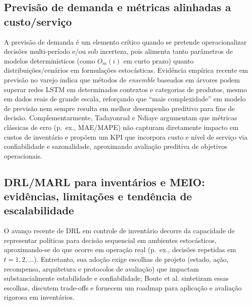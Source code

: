 \subsection{Previsão de demanda e métricas alinhadas a custo/serviço}

A previsão de demanda é um elemento crítico quando se pretende operacionalizar decisões multi-período e/ou sob incerteza, pois alimenta tanto parâmetros de modelos determinísticos (como \(O_m(i)\) em curto prazo) quanto distribuições/cenários em formulações estocásticas. Evidência empírica recente em previsão no varejo indica que métodos de \emph{ensemble} baseados em árvores podem superar redes LSTM em determinados contextos e categorias de produtos, mesmo em dados reais de grande escala, reforçando que ``mais complexidade'' em modelo de previsão nem sempre resulta em melhor desempenho preditivo para fins de decisão. \cite{Nasseri2023RetailDemandPrediction} Complementarmente, Tadayonrad e Ndiaye argumentam que métricas clássicas de erro (p.\ ex., MAE/MAPE) não capturam diretamente impacto em custos de inventário e propõem um KPI que incorpora custo e nível de serviço via confiabilidade e sazonalidade, aproximando avaliação preditiva de objetivos operacionais. \cite{TadayonradNdiaye2023KPIDemandForecasting}


\subsection{DRL/MARL para inventários e MEIO: evidências, limitações e tendência de escalabilidade}

O avanço recente de DRL em controle de inventário decorre da capacidade de representar políticas para decisão sequencial em ambientes estocásticos, aproximando-se do que ocorre em operação real (p.\ ex., decisões repetidas em \(t=1,2,\dots\)). Entretanto, sua adoção exige escolhas de projeto (estado, ação, recompensa, arquitetura e protocolos de avaliação) que impactam substancialmente estabilidade e confiabilidade; Boute et al. sintetizam essas escolhas, discutem trade-offs e fornecem um roadmap para aplicação e avaliação rigorosa em inventários. \cite{Boute2022DRLInventoryRoadmap}

